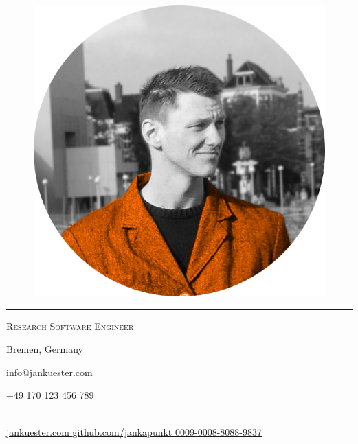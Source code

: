\documentclass[10pt,A4]{article}
\newcommand{\icon}[1]{\makebox[10pt][c]{\textcolor{sectcol}{\csname fa#1\endcsname}}}
\newcommand{\icontext}[2]{
	\icon{#1} \small{#2}
}
\begin{document}
\pagestyle{fancy}	


\begin{figure}[H]
\begin{center}
	\includegraphics[width=0.4\linewidth]{myfoto.png}
\end{center}
\end{figure}

\vspace{-48pt}
\textcolor{softcol}{\hrule}
\colorbox{white}{}

\begin{center}
	\small \textsc{Research Software Engineer}
\end{center}




\begin{center}
\icontext{MapMarker}{Bremen, Germany}
\href{mailto:info@jankuester.com}{\icontext{Envelope}{info@jankuester.com}}
\icontext{Mobile}{+49 170 123 456 789}
\\[10pt]
\href{https://jankuester.com}{\icontext{MousePointer}{jankuester.com}}
\href{https://github.com/jankapunkt}{\icontext{Github}{github.com/jankapunkt}}
\href{https://orcid.org/0009-0008-8088-9837}{\icontext{Orcid}{0009-0008-8088-9837}}
\end{center}
\end{document}
